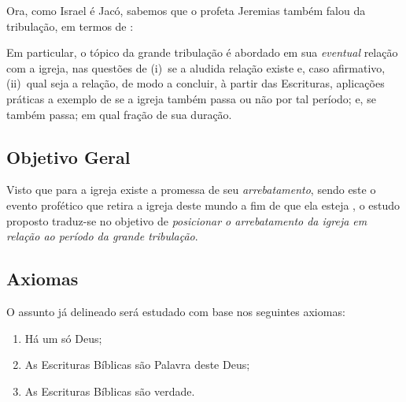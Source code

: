     Ora, como Israel é Jacó, sabemos que o profeta Jeremias também falou da tribulação, em termos de :


    Em particular, o tópico da grande tribulação é abordado em sua \emph{eventual} relação com a igreja, nas questões de  (i)~se
    a aludida relação existe e, caso afirmativo, (ii)~qual seja a  relação,  de  modo  a  concluir,  à  partir  das  Escrituras,
    aplicações práticas a exemplo de se a igreja também passa ou não por tal período; e, se também passa; em qual fração de  sua
    duração.

    \subsection{Objetivo Geral}

    Visto que para a igreja existe a promessa de seu \emph{arrebatamento}, sendo este o evento profético  que  retira  a  igreja
    deste mundo a fim de que ela esteja , o  estudo  proposto  traduz-se  no
    objetivo de \emph{posicionar o arrebatamento da igreja em relação ao período da grande tribulação}.

    \subsection{Axiomas}

    O assunto já delineado será estudado com base nos seguintes axiomas:

    \begin{enumerate}

        \item\label{ax:Deus.exis} Há um só Deus;

        \item\label{ax:Escr.pala} As Escrituras Bíblicas são Palavra deste Deus;

        \item\label{ax:Deus.verd} As Escrituras Bíblicas são verdade.

    \end{enumerate}

